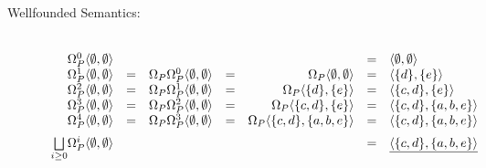\begin{Loesung}
\begin{UList}
\begin{description}
\item[Wellfounded Semantics:] ~\\
  \(
  \begin{array}[t]{rcrcrcl}
    \Omega^0_P\langle \emptyset,\emptyset\rangle & & & & & = &
    \langle\emptyset,\emptyset\rangle \\
    \Omega^1_P\langle \emptyset,\emptyset\rangle & = & 
    \Omega_P\Omega^0_P\langle \emptyset,\emptyset\rangle & = &
    \Omega_P\langle \emptyset,\emptyset\rangle & = & 
    \langle\{d\},\{e\}\rangle \\
    \Omega^2_P\langle \emptyset,\emptyset\rangle & = & 
    \Omega_P\Omega^1_P\langle \emptyset,\emptyset\rangle & = &
    \Omega_P\langle \{d\},\{e\}\rangle & = & 
    \langle\{c,d\},\{e\}\rangle \\
    \Omega^3_P\langle \emptyset,\emptyset\rangle & = & 
    \Omega_P\Omega^2_P\langle \emptyset,\emptyset\rangle & = &
    \Omega_P\langle \{c,d\},\{e\}\rangle & = & 
    \langle\{c,d\},\{a,b,e\}\rangle \\
    \Omega^4_P\langle \emptyset,\emptyset\rangle & = & 
    \Omega_P\Omega^3_P\langle \emptyset,\emptyset\rangle & = &
    \Omega_P\langle \{c,d\},\{a,b,e\}\rangle & = & 
    \langle\{c,d\},\{a,b,e\}\rangle \\[2mm]
    \underset{i\geq 0}{\bigsqcup}\Omega^i_P\langle \emptyset,\emptyset\rangle 
    & & & & & = & \underline{\langle\{c,d\},\{a,b,e\}\rangle}
  \end{array}
  \)
%
\end{description}
%
\item 
\begin{description}


\end{description}
\end{UList}
\end{Loesung}
